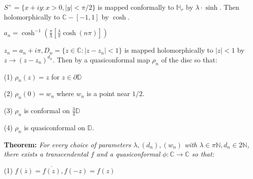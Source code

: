 \documentclass{beamer}
\begin{document}
\begin{frame} 

{\tiny $S^+ = \{ x + iy : x > 0, |y| < \pi/2 \}$ is mapped conformally to $\mathbb{H}_r$ by $\lambda\cdot\sinh$. Then holomorphically to $\mathbb{C} - [-1,1]$ by $\cosh$.

\vspace{1.25mm}

$a_n = \cosh^{-1}\left( \frac{\pi}{\lambda} \left[ \frac{\lambda}{\pi} \cosh(n\pi) \right] \right)$

\vspace{1.25mm}

$z_n = a_n + i\pi, D_n = \{ z \in \mathbb{C} : \left| z - z_n \right| < 1\} $ is mapped holomorphically to $|z|<1$ by $z\rightarrow (z - z_n)^{d_n}$. Then by a quasiconformal map $\rho_n$ of the disc so that: 

\hspace{5mm} (1) $\rho_n(z)=z$ for $z\in\partial\mathbb{D}$

\hspace{5mm} (2) $\rho_n(0)=w_n$ where $w_n$ is a point near $1/2$.

\hspace{5mm} (3) $\rho_n$ is conformal on $\frac{3}{4}\mathbb{D}$

\hspace{5mm} (4) $\rho_n$ is quasiconformal on $\mathbb{D}$.  

}

\vspace{5mm}

{\bf Theorem:}  {\it For every choice of parameters $\lambda, (d_n), (w_n)$ with $\lambda \in \pi\mathbb{N}, d_n \in 2\mathbb{N}$, there exists a transcendental $f$ and a quasiconformal $\phi: \mathbb{C}\rightarrow\mathbb{C}$ so that:}

\hspace{5mm} (1) $f(\overline{z}) = \overline{f(z)}, f(-z)=f(z)$


\end{frame}
\end{document}
